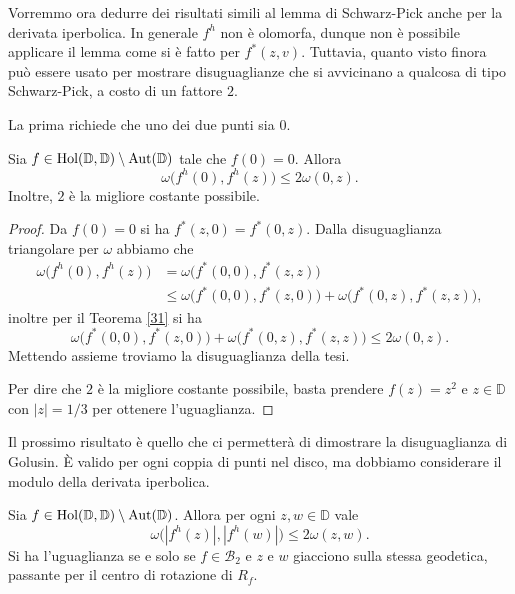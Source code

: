 Vorremmo ora dedurre dei risultati simili al lemma di Schwarz-Pick anche per la derivata iperbolica. In generale $f^h$ non è olomorfa, dunque non è possibile applicare il lemma come si è fatto per $f^*(z,v)$. Tuttavia, quanto visto finora può essere usato per mostrare disuguaglianze che si avvicinano a qualcosa di tipo Schwarz-Pick, a costo di un fattore $2$.

La prima richiede che uno dei due punti sia $0$.

\begin{cor} \label{36}
  Sia $f \in \text{\normalfont{Hol}}(\mathbb{D},\mathbb{D})\setminus\text{\normalfont{Aut}}(\mathbb{D})$ tale che $f(0)=0$. Allora
  \begin{equation}
    \omega\bigl(f^h(0),f^h(z)\bigr) \le 2\omega(0,z).
  \end{equation}
  Inoltre, $2$ è la migliore costante possibile.
\end{cor}

\begin{proof}
  Da $f(0)=0$ si ha $f^*(z,0)=f^*(0,z)$. Dalla disuguaglianza triangolare per $\omega$ abbiamo che
  \begin{align*}
    \omega\bigl(f^h(0),f^h(z)\bigr) & = \omega\bigl(f^*(0,0),f^*(z,z)\bigr) \\
    & \le \omega\bigl(f^*(0,0),f^*(z,0)\bigr)+\omega\bigl(f^*(0,z),f^*(z,z)\bigr),
  \end{align*}
  inoltre per il Teorema \ref{31} si ha
  $$\omega\bigl(f^*(0,0),f^*(z,0)\bigr)+\omega\bigl(f^*(0,z),f^*(z,z)\bigr)\le 2\omega(0,z).$$
  Mettendo assieme troviamo la disuguaglianza della tesi.

  Per dire che $2$ è la migliore costante possibile, basta prendere $f(z)=z^2$ e $z \in \mathbb{D}$ con $|z|=1/3$ per ottenere l'uguaglianza.
\end{proof}

Il prossimo risultato è quello che ci permetterà di dimostrare la disuguaglianza di Golusin. È valido per ogni coppia di punti nel disco, ma dobbiamo considerare il modulo della derivata iperbolica.

\begin{cor} \label{quasigolusin}
  Sia $f \in \text{\normalfont{Hol}}(\mathbb{D},\mathbb{D})\setminus\text{\normalfont{Aut}}(\mathbb{D})$. Allora per ogni $z, w \in \mathbb{D}$ vale
  \begin{equation} \label{quasigol}
    \omega\bigl(|f^h(z)|, |f^h(w)|\bigr) \le 2\omega(z,w).
  \end{equation}
  Si ha l'uguaglianza se e solo se $f \in \mathcal{B}_2$ e $z$ e $w$ giacciono sulla stessa geodetica, passante per il centro di rotazione di $R_f$.
\end{cor}

